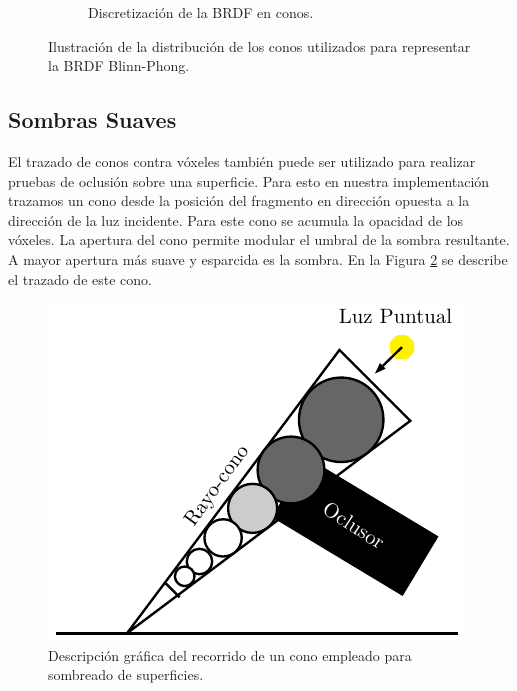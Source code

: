 \begin{figure}[H]
\begin{subfigure}[t]{.32\linewidth}
		\caption*{Discretización de la BRDF en conos.}
	\end{subfigure}%
	\caption{Ilustración de la distribución de los conos utilizados para representar la \ac{BRDF} Blinn-Phong.}
	\label{fig:brdf_cones2}
\end{figure}

\subsection{Sombras Suaves} %
\label{sub:sombras_suaves_con_trazado_de_conos}
El trazado de conos contra vóxeles también puede ser utilizado para realizar pruebas de oclusión sobre una superficie. Para esto en nuestra implementación trazamos un cono desde la posición del fragmento en dirección opuesta a la dirección de la luz incidente. Para este cono se acumula la opacidad de los vóxeles. La apertura del cono permite modular el umbral de la sombra resultante. A mayor apertura más suave y esparcida es la sombra. En la Figura \ref{fig:shadow_cone_prop} se describe el trazado de este cono.

\begin{figure}[H]
	\centering
	\captionsetup{justification=centering}
	\includegraphics[width=.4\linewidth]{media/shadow_cone.pdf}
	\caption{Descripción gráfica del recorrido de un cono empleado para sombreado de superficies.}
	\label{fig:shadow_cone_prop}
\end{figure}

